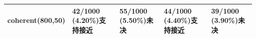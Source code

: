 \begin{longtable}{p{27mm}p{31mm}p{31mm}p{31mm}p{31mm}}
coherent\newline (800,50) & 42/1000 (4.20\%)\newline [3.04, 5.64]\newline 支持接近 & 55/1000 (5.50\%)\newline [4.17, 7.10]\newline 未决 & 44/1000 (4.40\%)\newline [3.21, 5.86]\newline 支持接近 & 39/1000 (3.90\%)\newline [2.79, 5.29]\newline 未决 \\
\bottomrule
\end{longtable}
\endgroup
{}
